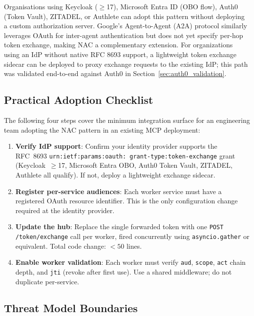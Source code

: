 \documentclass[journal]{IEEEtran}
\begin{document}
Organisations using Keycloak ($\geq$17), Microsoft Entra ID (OBO flow), Auth0
(Token Vault), ZITADEL, or Authlete can adopt this pattern without deploying a
custom authorization server. Google's Agent-to-Agent (A2A) protocol
\cite{google_a2a} similarly leverages OAuth for inter-agent authentication but
does not yet specify per-hop token exchange, making NAC a complementary
extension. For organizations using an IdP without native RFC 8693 support, a
lightweight token exchange sidecar can be deployed to proxy exchange requests
to the existing IdP; this path was validated end-to-end against Auth0 in
Section~\ref{sec:auth0_validation}.

\subsection{Practical Adoption Checklist}

The following four steps cover the minimum integration surface for an engineering
team adopting the NAC pattern in an existing MCP deployment:

\begin{enumerate}
  \item \textbf{Verify IdP support}: Confirm your identity provider supports the
      RFC~8693
      \texttt{urn:ietf:\allowbreak params:\allowbreak oauth:\allowbreak
      grant-type:\allowbreak token-exchange}
      grant (Keycloak~$\geq$17, Microsoft Entra OBO, Auth0 Token Vault,
      ZITADEL, Authlete all qualify). If not, deploy a lightweight exchange
      sidecar.
  \item \textbf{Register per-service audiences}: Each worker service must have a
        registered OAuth resource identifier. This is the only configuration change
        required at the identity provider.
  \item \textbf{Update the hub}: Replace the single forwarded token with one
        \texttt{POST /token/exchange} call per worker, fired concurrently using
        \texttt{asyncio.gather} or equivalent. Total code change: $<50$ lines.
  \item \textbf{Enable worker validation}: Each worker must verify \texttt{aud},
        \texttt{scope}, \texttt{act} chain depth, and \texttt{jti} (revoke after
        first use). Use a shared middleware; do not duplicate per-service.
\end{enumerate}

\subsection{Threat Model Boundaries}
\end{document}
